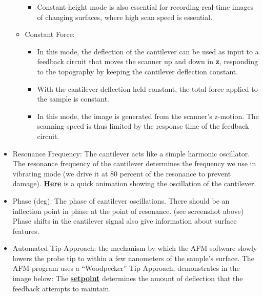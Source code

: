 \documentclass{../lab}
\begin{document}
\begin{itemize}
\begin{itemize}
\begin{itemize}
            \item Constant-height mode is also essential for recording real-time images of changing surfaces, where high scan speed is essential.

        \end{itemize}

        \item Constant Force:

        \begin{itemize}
            \item In this mode, the deflection of the cantilever can be used as input to a feedback circuit that moves the scanner up and down in \textbf{z}, responding to the topography by keeping the cantilever deflection constant.

            \item With the cantilever deflection held constant, the total force applied to the sample is constant.

            \item In this mode, the image is generated from the scanner's z-motion. The scanning speed is thus limited by the response time of the feedback circuit.

        \end{itemize}

    \end{itemize}

    \item Resonance Frequency: The cantilever acts like a simple harmonic oscillator. The resonance frequency of the cantilever determines the frequency we use in vibrating mode (we drive it at 80 percent of the resonance to prevent damage). \href{http://experimentationlab.berkeley.edu/sites/default/files/AFMImages/2.1.1.\%20Intro\%20Vibrating\%20Cantf.swf.mp4}{\textbf{Here}} is a quick animation showing the oscillation of the cantilever.

    \item Phase (deg): The phase of cantilever oscillations.  There should be an inflection point in phase at the point of resonance. (see screenshot above) Phase shifts in the cantilever signal also give information about surface features.

    \item Automated Tip Approach:  the mechanism by which the AFM software slowly lowers the probe tip to within a few nanometers of the sample's surface.  The AFM program uses a ``Woodpecker'' Tip Approach, demonstrates in the image below: The \href{http://experimentationlab.berkeley.edu/sites/default/files/AFMImages/VM\%203.3.\%20Avg\%20Dist\%20Control\_converted.mp4}{\textbf{setpoint}} determines the amount of deflection that the feedback attempts to maintain.
    

\end{itemize}
\end{document}
